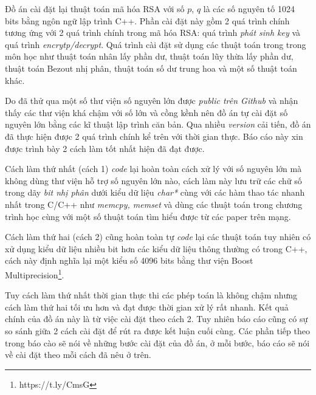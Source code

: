 Đồ án cài đặt lại thuật toán mã hóa RSA với số $p$, $q$ là các số nguyên tố 1024 bits bằng ngôn ngữ lập trình C++. 
Phần cài đặt này gồm 2 quá trình chính tương ứng với 2 quá trình chính trong mã hóa RSA: 
quá trình \textit{phát sinh key} và quá trình \textit{encrytp/decrypt}.
Quá trình cài đặt sử dụng các thuật toán trong trong môn học như thuật toán nhân lấy phần dư, 
thuật toán lũy thừa lấy phần dư, thuật toán Bezout nhị phân, thuật toán số dư trung hoa và một số thuật toán khác. 

Do đã thử qua một số thư viện số nguyên lớn được \textit{public trên Github} và nhận thấy các thư viện khá chậm với số lớn và cồng kềnh nên đồ án tự cài đặt số nguyên lớn bằng các kĩ thuật lập trình căn bản.
Qua nhiều \textit{version} cải tiến, đồ án đã thực hiện được 2 quá trình chính kể trên với thời gian thực.
Báo cáo này xin được trình bày 2 cách làm tốt nhất hiện đã đạt được. 

Cách làm thứ nhất (cách 1) \textit{code} lại hoàn toàn cách xử lý với số nguyên lớn mà không dùng thư viện hỗ trợ số nguyên lớn nào, 
cách làm này lưu trữ các chữ số trong dãy \textit{bit nhị phân} dưới kiểu dữ liệu \textit{char*} cùng với các hàm thao tác nhanh nhất trong C/C++ như \textit{memcpy, memset}
và dùng các thuật toán trong chương trình học cùng với một số thuật toán tìm hiểu được từ các paper trên mạng.

Cách làm thứ hai (cách 2) cũng hoàn toàn tự \textit{code} lại các thuật toán tuy nhiên có xử dụng kiểu dữ liệu nhiều bit hơn các kiểu dữ liệu thông thường có trong C++, 
cách này định nghĩa lại một kiểu số 4096 bits bằng thư viện Boost Multiprecision\footnote{https://t.ly/CmsG}.

Tuy cách làm thứ nhất thời gian thực thi các phép toán là không chậm nhưng cách làm thứ hai tối ưu hơn và đạt được thời gian xử lý rất nhanh. 
Kết quả chính của đồ án này là từ việc cài đặt theo cách 2. Tuy nhiên báo cáo cũng có sự so sánh giữa 2 cách cài đặt để rút ra được kết luận cuối cùng. Các phần tiếp theo trong 
báo cào sẽ nói về những bước cài đặt của đồ án, ở mỗi bước, báo cáo sẽ nói về cài đặt theo mỗi cách đã nêu ở trên.